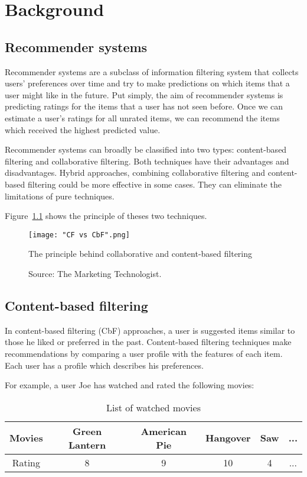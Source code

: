 \documentclass[oneside,13pt]{extreport}
\begin{document}
\chapter{Background}
\label{backgroud_chapter}
\section{Recommender systems}
Recommender systems are a subclass of information filtering system that collects users’ preferences over time and try to make predictions on which items that a user might like in the future. Put simply, the aim of recommender systems is predicting ratings for the items that a user has not seen before. Once we can estimate a user's ratings for all unrated items, we can recommend the items which received the highest predicted value.

Recommender systems can broadly be classified into two types: content-based filtering and collaborative filtering. Both techniques have their advantages and disadvantages. Hybrid approaches, combining collaborative filtering and content-based filtering could be more effective in some cases. They can eliminate the limitations of pure techniques.

Figure~\ref{fig:CF vs CbF} shows the principle of theses two techniques.
\clearpage
\begin{figure}[h!]
    \centering
    \texttt{[image: "CF vs CbF".png]} 
    \caption{The principle behind collaborative and content-based filtering}
    \!\!\!\!
    \caption*{Source: The Marketing Technologist.}
    \label{fig:CF vs CbF}
\end{figure}

\section{Content-based filtering}
In content-based filtering (CbF) approaches, a user is suggested items similar to those he liked or preferred in the past. Content-based filtering techniques  make recommendations by comparing a user profile with the features of each item. Each user has a profile which describes his preferences.  

For example, a user Joe has watched and rated the following movies: 
\begin{table}[h!]
    \small\centering
    \begin{tabular}{|c|c|c|c|c|c|}
        \hline
        Movies & Green Lantern & American Pie & Hangover & Saw & ...   \\
        \hline
        Rating & 8 & 9 & 10 & 4 & ...\\
        \hline
    \end{tabular}
    \caption*{List of watched movies}
\end{table}
\end{document}
